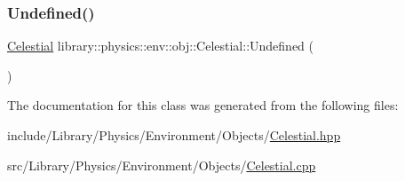 \subsubsection{\texorpdfstring{Undefined()}{Undefined()}}
{\footnotesize\ttfamily \hyperlink{classlibrary_1_1physics_1_1env_1_1obj_1_1_celestial}{Celestial} library\+::physics\+::env\+::obj\+::\+Celestial\+::\+Undefined (\begin{DoxyParamCaption}{ }\end{DoxyParamCaption})\hspace{0.3cm}{\ttfamily [static]}}



The documentation for this class was generated from the following files\+:\begin{DoxyCompactItemize}
\item 
include/\+Library/\+Physics/\+Environment/\+Objects/\hyperlink{_celestial_8hpp}{Celestial.\+hpp}\item 
src/\+Library/\+Physics/\+Environment/\+Objects/\hyperlink{_celestial_8cpp}{Celestial.\+cpp}\end{DoxyCompactItemize}
